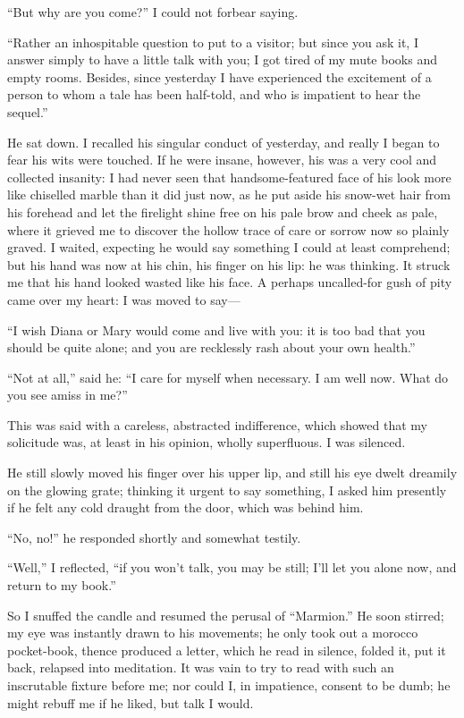 \enquote{But why are you come?} I could not forbear saying.

\enquote{Rather an inhospitable question to put to a visitor; but since
	you ask it, I answer simply to have a little talk with you; I got tired
	of my mute books and empty rooms. Besides, since yesterday I have
	experienced the excitement of a person to whom a tale has been
	half-told, and who is impatient to hear the sequel.}

He sat down. I recalled his singular conduct of yesterday, and really I
began to fear his wits were touched. If he were insane, however, his
was a very cool and collected insanity: I had never seen that
handsome-featured face of his look more like chiselled marble than it
did just now, as he put aside his snow-wet hair from his forehead and
let the firelight shine free on his pale brow and cheek as pale, where
it grieved me to discover the hollow trace of care or sorrow now so
plainly graved. I waited, expecting he would say something I could at
least comprehend; but his hand was now at his chin, his finger on his
lip: he was thinking. It struck me that his hand looked wasted like his
face. A perhaps uncalled-for gush of pity came over my heart: I was
moved to say---

\enquote{I wish Diana or Mary would come and live with you: it is too
	bad that you should be quite alone; and you are recklessly rash about
	your own health.}

\enquote{Not at all,} said he: \enquote{I care for myself when
	necessary. I am well now. What do you see amiss in me?}

This was said with a careless, abstracted indifference, which showed
that my solicitude was, at least in his opinion, wholly superfluous. I
was silenced.

He still slowly moved his finger over his upper lip, and still his eye
dwelt dreamily on the glowing grate; thinking it urgent to say
something, I asked him presently if he felt any cold draught from the
door, which was behind him.

\enquote{No, no!} he responded shortly and somewhat testily.

\enquote{Well,} I reflected, \enquote{if you won't talk, you may be
	still; I'll let you alone now, and return to my book.}

So I snuffed the candle and resumed the perusal of \enquote{Marmion.}
He soon stirred; my eye was instantly drawn to his movements; he only
took out a morocco pocket-book, thence produced a letter, which he read
in silence, folded it, put it back, relapsed into meditation. It was
vain to try to read with such an inscrutable fixture before me; nor
could I, in impatience, consent to be dumb; he might rebuff me if he
liked, but talk I would.

